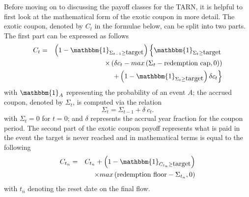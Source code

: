 Before moving on to discussing the payoff classes for the TARN, it is helpful to first look at the mathematical form of the exotic coupon in more detail. The exotic coupon, denoted by $C_t$ in the formulae below, can be split into two parts. The first part can be expressed as follows
\begin{eqnarray}
C_t &=& \left(1-\mathbbm{1}_{\Sigma_{t-1} \ge \mbox{target}}\right) \left\{ \mathbbm{1}_{\Sigma_t \ge \mbox{target}} \right. \nonumber \\
 & &\times \left(\delta c_t - max\left(\Sigma_t-\mbox{redemption cap},0\right)\right) \nonumber \\
 & &\left. +\left(1-\mathbbm{1}_{\Sigma_t \ge \mbox{target}} \right) \delta c_t \right\}
\end{eqnarray}
with $\mathbbm{1}_{A}$ representing the probability of an event $A$; the accrued coupon, denoted by $\Sigma_t$, is computed via the relation
\begin{equation}
\Sigma_t = \Sigma_{t-1}+\delta ~c_t.
\end{equation}
with $\Sigma_t = 0$ for $t=0$; and $\delta$ represents the accrual year fraction for the coupon period. The second part of the exotic coupon payoff represents what is paid in the event the target is never reached and in mathematical terms is equal to the following
\begin{eqnarray}
C_{t_n} &=& C_{t_n}+\left(1-\mathbbm{1}_{C_{t_n} \ge \mbox{target}} \right) \nonumber \\
                          & & \times max\left(\mbox{redemption floor}-\Sigma_{t_n},0\right)
\end{eqnarray}
with $t_n$ denoting the reset date on the final flow.

